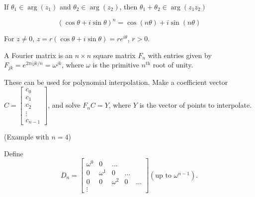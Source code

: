 \documentclass{article}
\begin{document}
    If $\theta_1 \in \arg(z_1)$ and $\theta_2 \in \arg(z_2)$, then $\theta_1 + \theta_2 \in \arg(z_1z_2)$

\medskip
{}

    $$(\cos\theta + i\sin\theta)^n = \cos(n\theta) + i\sin(n\theta)$$

\medskip
{}

    For $z \neq 0$, $z = r(\cos\theta + i\sin\theta) = re^{i\theta}$, $r > 0$.

\medskip
{}

    A Fourier matrix is an $n \times n$ square matrix $F_n$ with entries given by $F_{jk} = e^{2\pi ijk/n} = \omega^{jk}$, where $\omega$ is the primitive $n^{\text{th}}$ root of unity.

    These can be used for polynomial interpolation.
    Make a coefficient vector $C = \begin{bmatrix} c_0 \\ c_1 \\ c_2 \\ \vdots \\ c_{n-1} \end{bmatrix}$, and solve $F_nC = Y$, where $Y$ is the vector of points to interpolate.

\medskip
{}

    (Example with $n=4$)

    Define $$D_n = \begin{bmatrix} \omega^0 & 0 & \hdots \\ 0 & \omega^1 & 0 & \hdots \\ 0 & 0 & \omega^2 & 0 & \hdots \\ \vdots\end{bmatrix} (\text{up to } \omega^{n-1}).$$
\end{document}
